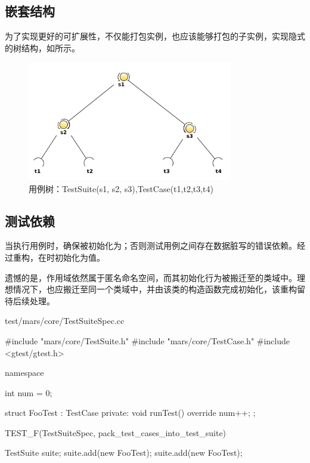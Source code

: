 \begin{content}
\section{嵌套结构}

为了实现更好的可扩展性，不仅能打包实例，也应该能够打包的子实例，实现隐式的树结构，如所示。

\begin{figure}[H]
\centering
\includegraphics[width=0.8\textwidth]{figures/xunit/test-tree-example.png}
\caption{用例树：TestSuite(s1, s2, s3),TestCase(t1,t2,t3,t4)}
 \label{fig:test-case-tree}
\end{figure}

\subsection{测试依赖}

当执行用例时，确保被初始化为；否则测试用例之间存在数据脏写的错误依赖。经过重构，在时初始化为值。

遗憾的是，作用域依然属于匿名命名空间，而其初始化行为被搬迁至的类域中。理想情况下，也应搬迁至同一个类域中，并由该类的构造函数完成初始化，该重构留待后续处理。

\begin{diff}{test/mars/core/TestSuiteSpec.cc}
 \begin{minicpp}
#include "mars/core/TestSuite.h"
#include "mars/core/TestCase.h"
#include <gtest/gtest.h>

namespace {
  int num = 0;

  struct FooTest : TestCase {
  private:
    void runTest() override {
      num++;
    }
  };
}

TEST_F(TestSuiteSpec, pack_test_cases_into_test_suite) {
  TestSuite suite;
  suite.add(new FooTest);
  suite.add(new FooTest);

}
\end{minicpp}
\end{diff}
\end{content}

